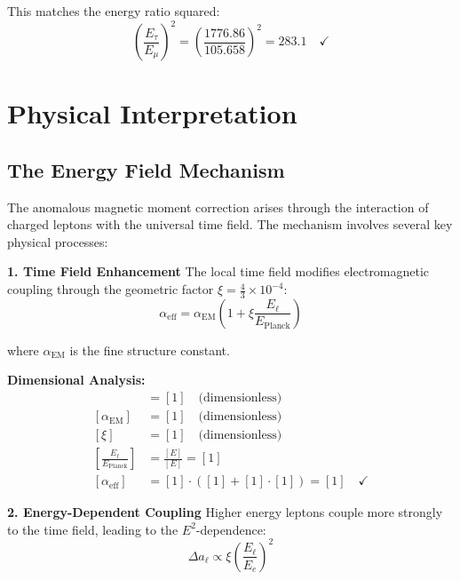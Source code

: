 \documentclass[12pt,a4paper]{report}
\begin{document}
	This matches the energy ratio squared:
	\begin{equation}
		\left(\frac{E_\tau}{E_\mu}\right)^2 = \left(\frac{1776.86}{105.658}\right)^2 = 283.1 \quad \checkmark
	\end{equation}
	
	\section{Physical Interpretation}
	\label{sec:physical_interpretation}
	
	\subsection{The Energy Field Mechanism}
	\label{subsec:energy_field_mechanism}
	
	The anomalous magnetic moment correction arises through the interaction of charged leptons with the universal time field. The mechanism involves several key physical processes:
	
	\textbf{1. Time Field Enhancement}
	The local time field modifies electromagnetic coupling through the geometric factor $\xi = \frac{4}{3} \times 10^{-4}$:
	\begin{equation}
		\alpha_{\text{eff}} = \alpha_{\text{EM}} \left(1 + \xi \frac{E_\ell}{E_{\text{Planck}}}\right)
	\end{equation}
	
	where $\alpha_{\text{EM}}$ is the fine structure constant.
	
	\textbf{Dimensional Analysis:}
	\begin{align}
		[\alpha_{\text{eff}}] &= [1] \quad \text{(dimensionless)} \\
		[\alpha_{\text{EM}}] &= [1] \quad \text{(dimensionless)} \\
		[\xi] &= [1] \quad \text{(dimensionless)} \\
		\left[\frac{E_\ell}{E_{\text{Planck}}}\right] &= \frac{[E]}{[E]} = [1] \\
		[\alpha_{\text{eff}}] &= [1] \cdot ([1] + [1] \cdot [1]) = [1] \quad \checkmark
	\end{align}
	
	\textbf{2. Energy-Dependent Coupling}
	Higher energy leptons couple more strongly to the time field, leading to the $E^2$-dependence:
	\begin{equation}
		\Delta a_\ell \propto \xi \left(\frac{E_\ell}{E_e}\right)^2
	\end{equation}
	
\end{document}
